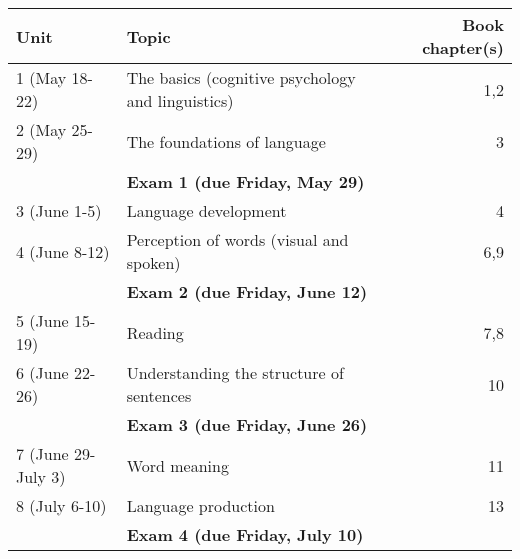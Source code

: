 \documentclass[10pt]{article}
\begin{document}
\begin{center}
\begin{tabular}{llr}
Unit & Topic & Book chapter(s)\\
\hline
1 (May 18-22) & The basics (cognitive psychology and linguistics) & 1,2\\
2 (May 25-29) & The foundations of language & 3\\
 & \textbf{Exam 1 (due Friday, May 29)} & \\
3 (June 1-5) & Language development & 4\\
4 (June 8-12) & Perception of words (visual and spoken) & 6,9\\
 & \textbf{Exam 2 (due Friday, June 12)} & \\
5 (June 15-19) & Reading & 7,8\\
6 (June 22-26) & Understanding the structure of sentences & 10\\
 & \textbf{Exam 3 (due Friday, June 26)} & \\
7 (June 29-July 3) & Word meaning & 11\\
8 (July 6-10) & Language production & 13\\
 & \textbf{Exam 4 (due Friday, July 10)} & \\
\end{tabular}
\end{center}
\end{document}
